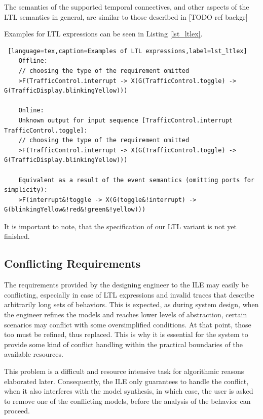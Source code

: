 The semantics of the supported temporal connectives, and other aspects of the LTL semantics in general, are similar to those described in [TODO ref backgr] %

Examples for LTL expressions can be seen in Listing \ref{lst_ltlex}.

\bigskip
\begin{lstlisting} [language=tex,caption=Examples of LTL expressions,label=lst_ltlex]
	Offline:
	// choosing the type of the requirement omitted
	>F(TrafficControl.interrupt -> X(G(TrafficControl.toggle) -> G(TrafficDisplay.blinkingYellow)))

	Online: 
	Unknown output for input sequence [TrafficControl.interrupt TrafficControl.toggle]:
	// choosing the type of the requirement omitted
	>F(TrafficControl.interrupt -> X(G(TrafficControl.toggle) -> G(TrafficDisplay.blinkingYellow)))
	
	Equivalent as a result of the event semantics (omitting ports for simplicity):
	>F(interrupt&!toggle -> X(G(toggle&!interrupt) -> G(blinkingYellow&!red&!green&!yellow)))
\end{lstlisting}

It is important to note, that the specification of our LTL variant is not yet finished.

\subsection{Conflicting Requirements} \label{subs_conf}
The requirements provided by the designing engineer to the ILE may easily be conflicting, especially in case of LTL expressions and invalid traces that describe arbitrarily long sets of behaviors. This is expected, as during system design, when the engineer refines the models and reaches lower levels of abstraction, certain scenarios may conflict with some oversimplified conditions. At that point, those too must be refined, thus replaced. This is why it is essential for the system to provide some kind of conflict handling within the practical boundaries of the available resources. 

This problem is a difficult and resource intensive task for algorithmic reasons elaborated later. Consequently, the ILE only guarantees to handle the conflict, when it also interferes with the model synthesis, in which case, the user is asked to remove one of the conflicting models, before the analysis of the behavior can proceed.

